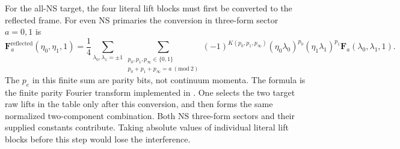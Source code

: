 For the all-NS target, the four literal lift blocks must first be
converted to the reflected frame. For even NS primaries the
conversion in three-form sector $a=0,1$ is
\begin{equation}
 \mathbf F^{\mathrm{reflected}}_a(\eta_0,\eta_1,1)
 =\frac14\sum_{\lambda_0,\lambda_1=\pm1}
 \sum_{\substack{p_0,p_1,p_\infty\in\{0,1\}\\
                  p_0+p_1+p_\infty=a\ (\mathrm{mod}\ 2)}}
 (-1)^{K(p_0,p_1,p_\infty)}
 (\eta_0\lambda_0)^{p_0}(\eta_1\lambda_1)^{p_1}
 \mathbf F_a(\lambda_0,\lambda_1,1).
 \label{eq:partition-ns-transform}
\end{equation}
The $p_e$ in this finite sum are parity bits, not continuum
momenta. The formula is the finite parity Fourier transform
implemented in .
One selects the two target raw lifts in the table only after this
conversion, and then forms the same normalized two-component
combination. Both NS three-form sectors and their supplied
constants contribute. Taking absolute values of individual
literal lift blocks before this step would lose the interference.


